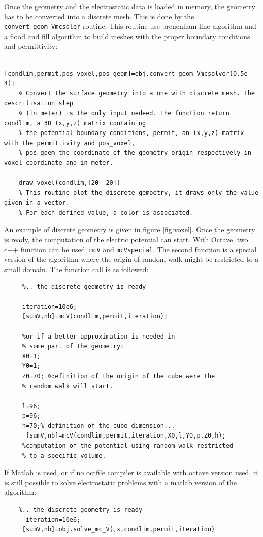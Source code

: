 \documentclass[10pt]{article}
\begin{document}
    Once the geometry and the electrostatic data is loaded in memory, the geometry has to be converted into a discrete mesh. This is done by the \lstinline{convert_geom_Vmcsoler} routine.
    This routine use brenenham line algorithm and a flood and fill algorithm to build meshes with the proper boundary conditions and permittivity:
       
	\begin{lstlisting}
	[condlim,permit,pos_voxel,pos_geom]=obj.convert_geom_Vmcsolver(0.5e-4);
	% Convert the surface geometry into a one with discrete mesh. The descritisation step
	% (in meter) is the only input nedeed. The function return condlim, a 3D (x,y,z) matrix containing
	% the potential boundary conditions, permit, an (x,y,z) matrix with the permittivity and pos_voxel,
	% pos_goem the coordinate of the geometry origin respectively in voxel coordinate and in meter. 
	
	draw_voxel(condlim,[20 -20])
	% This routine plot the discrete gemoetry, it draws only the value given in a vector.
	% For each defined value, a color is associated.
	\end{lstlisting}       
	
	An example of discrete geometry is given in figure \ref{fig:voxel}. Once the geometry is ready, the computation of the electric potential can start.
	 With Octave, two c++ function can be used, \lstinline{mcV} and \lstinline{mcVspecial}. The second function is a special version of the algorithm where the origin of random walk might be restricted to a small domain. The function call is as followed:
	 
	 \begin{lstlisting}
	 %.. the discrete geometry is ready
	 
	 iteration=10e6;
	 [sumV,nb]=mcV(condlim,permit,iteration);
	 
	 %or if a better approximation is needed in 
	 % some part of the geometry:
	 X0=1;
	 Y0=1;
	 Z0=70; %definition of the origin of the cube were the 
	 % random walk will start.
	 
	 l=96; 
	 p=96;
	 h=70;% definition of the cube dimension...
	  [sumV,nb]=mcV(condlim,permit,iteration,X0,l,Y0,p,Z0,h);
	 %computation of the potential using random walk restricted
	 % to a specific volume.
	 \end{lstlisting}
	
	If Matlab is used, or if no octfile compiler is available with octave version used, it is still possible to solve electrostatic problems with a matlab version of the algorithm:
	 \begin{lstlisting}
	%.. the discrete geometry is ready
	  iteration=10e6;
	 [sumV,nb]=obj.solve_mc_V(,x,condlim,permit,iteration)
	 \end{lstlisting}
	 
\end{document}
